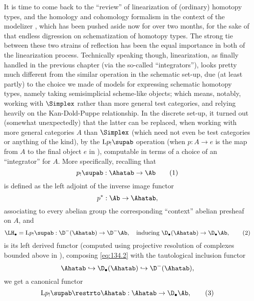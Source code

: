 \presectionfill{}\par

\label{sec:134}%
It is time to come back to the ``review'' of linearization of
(ordinary) homotopy types, and the homology and cohomology formalism
in the context of the modelizer \Cat, which has been pushed aside now
for over two months, for the sake of that endless digression on
schematization of homotopy types. The strong tie between these two
strains of reflection has been the equal importance in both of the
linearization process. Technically speaking though, linearization, as
finally handled in the previous chapter (via the so-called
``integrators''), looks pretty much different from the similar
operation in the schematic set-up, due (at least partly) to the choice
we made of models for expressing schematic homotopy types, namely
taking semisimplicial scheme-like objects; which means, notably,
working with $\Simplex$ rather than more general test categories, and
relying heavily on the Kan-Dold-Puppe relationship. In the discrete
set-up, it turned out (somewhat unexpectedly) that the latter can be
replaced, when working with more general categories $A$ than
$\Simplex$ (which need not even be test categories or anything of the
kind), by the $\mathrm Lp_!\supab$ operation (when $p:A\to e$ is the
map from $A$ to the final object $e$ in \Cat), computable in terms of
a choice of an ``integrator'' for $A$. More specifically, recalling
that
\begin{equation}
  \label{eq:134.1}
  p_!\supab : \Ahatab \to \Ab\tag{1}
\end{equation}
is defined as the left adjoint of the inverse image functor
\[p^*:\Ab\to\Ahatab,\]
associating to every abelian group the corresponding ``context''
abelian presheaf on $A$, and
\begin{equation}
  \label{eq:134.2}
  \LH_\bullet = \mathrm Lp_!\supab : \D^-(\Ahatab) \to \D^-\Ab, \quad
  \text{inducing $\D_\bullet(\Ahatab)\to\D_\bullet\Ab$},\tag{2}
\end{equation}
is its left derived functor (computed using projective resolution of
complexes bounded above in \Ahatab), composing \eqref{eq:134.2} with
the tautological inclusion functor
\[\Ahatab\hookrightarrow\D_\bullet(\Ahatab)\hookrightarrow
  \D^-(\Ahatab),\]
we get a canonical functor
\begin{equation}
  \label{eq:134.3}
  \mathrm Lp_!\supab \restrto \Ahatab:\Ahatab\to \D_\bullet\Ab,\tag{3}
\end{equation}

